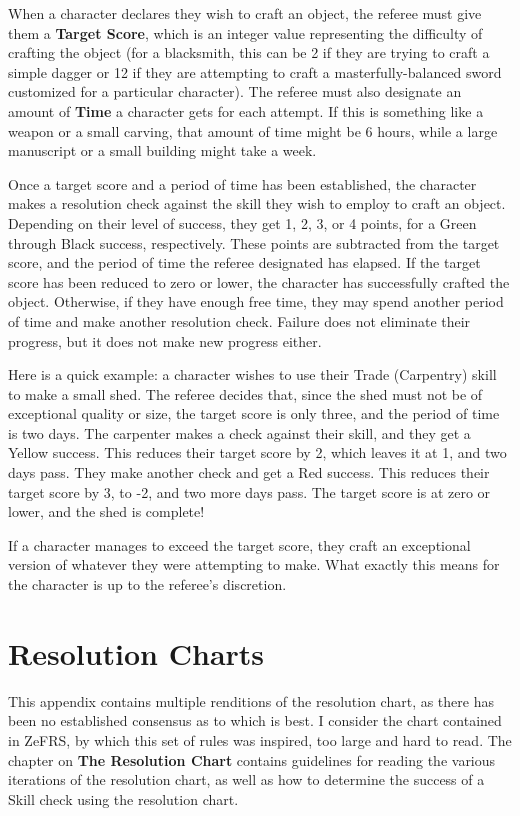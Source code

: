 \documentclass[oneside]{book}
\begin{document}
\begin{multicols}{2}
When a character declares they wish to craft an object, the referee must give them a \textbf{Target Score}, which is an integer value representing the difficulty of crafting the object (for a blacksmith, this can be 2 if they are trying to craft a simple dagger or 12 if they are attempting to craft a masterfully-balanced sword customized for a particular character). The referee must also designate an amount of \textbf{Time} a character gets for each attempt. If this is something like a weapon or a small carving, that amount of time might be 6 hours, while a large manuscript or a small building might take a week. 

Once a target score and a period of time has been established, the character makes a resolution check against the skill they wish to employ to craft an object. Depending on their level of success, they get 1, 2, 3, or 4 points, for a Green through Black success, respectively. These points are subtracted from the target score, and the period of time the referee designated has elapsed. If the target score has been reduced to zero or lower, the character has successfully crafted the object. Otherwise, if they have enough free time, they may spend another period of time and make another resolution check. Failure does not eliminate their progress, but it does not make new progress either. 

Here is a quick example: a character wishes to use their Trade (Carpentry) skill to make a small shed. The referee decides that, since the shed must not be of exceptional quality or size, the target score is only three, and the period of time is two days. The carpenter makes a check against their skill, and they get a Yellow success. This reduces their target score by 2, which leaves it at 1, and two days pass. They make another check and get a Red success. This reduces their target score by 3, to -2, and two more days pass. The target score is at zero or lower, and the shed is complete! 

If a character manages to exceed the target score, they craft an exceptional version of whatever they were attempting to make. What exactly this means for the character is up to the referee's discretion. 

\end{multicols}

\appendix
\chapter{Resolution Charts}
This appendix contains multiple renditions of the resolution chart, as there has been no established consensus as to which is best. I consider the chart contained in ZeFRS, by which this set of rules was inspired, too large and hard to read. The chapter on \textbf{The Resolution Chart} contains guidelines for reading the various iterations of the resolution chart, as well as how to determine the success of a Skill check using the resolution chart. 
\end{document}
